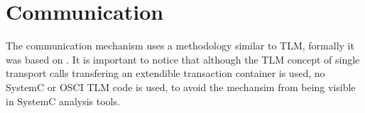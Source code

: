 




\section{Communication}

The \GreenControl communication mechanism uses a methodology similar to TLM, formally it was based on \GreenBus. It is important to notice that although the TLM concept of single transport calls transfering an extendible transaction container is used, no SystemC or OSCI TLM code is used, to avoid the \GreenControl mechansim from being visible in SystemC analysis tools.


